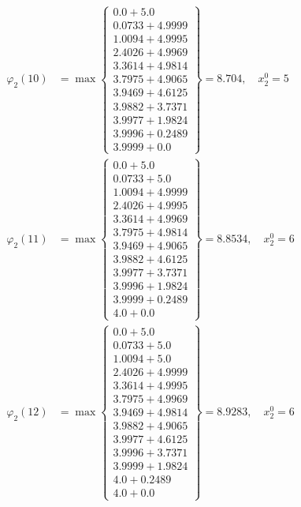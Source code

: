 \documentclass{article}
\begin{document}
\begin{align*}
\varphi_{2}(10) &= \max \left\{ \begin{array}{c}
0.0 + 5.0 \\
 0.0733 + 4.9999 \\
 1.0094 + 4.9995 \\
 2.4026 + 4.9969 \\
 3.3614 + 4.9814 \\
 3.7975 + 4.9065 \\
 3.9469 + 4.6125 \\
 3.9882 + 3.7371 \\
 3.9977 + 1.9824 \\
 3.9996 + 0.2489 \\
 3.9999 + 0.0
\end{array} \right\}=8.704, \quad x_{2}^0=5\\
  
\varphi_{2}(11) &= \max \left\{ \begin{array}{c}
0.0 + 5.0 \\
 0.0733 + 5.0 \\
 1.0094 + 4.9999 \\
 2.4026 + 4.9995 \\
 3.3614 + 4.9969 \\
 3.7975 + 4.9814 \\
 3.9469 + 4.9065 \\
 3.9882 + 4.6125 \\
 3.9977 + 3.7371 \\
 3.9996 + 1.9824 \\
 3.9999 + 0.2489 \\
 4.0 + 0.0
\end{array} \right\}=8.8534, \quad x_{2}^0=6\\
  
\varphi_{2}(12) &= \max \left\{ \begin{array}{c}
0.0 + 5.0 \\
 0.0733 + 5.0 \\
 1.0094 + 5.0 \\
 2.4026 + 4.9999 \\
 3.3614 + 4.9995 \\
 3.7975 + 4.9969 \\
 3.9469 + 4.9814 \\
 3.9882 + 4.9065 \\
 3.9977 + 4.6125 \\
 3.9996 + 3.7371 \\
 3.9999 + 1.9824 \\
 4.0 + 0.2489 \\
 4.0 + 0.0
\end{array} \right\}=8.9283, \quad x_{2}^0=6\\
  

\end{align*}
\end{document}

